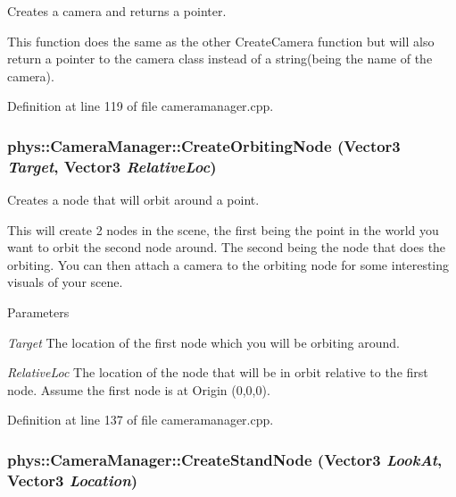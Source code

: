 Creates a camera and returns a pointer. 

This function does the same as the other CreateCamera function but will also return a pointer to the camera class instead of a string(being the name of the camera). 

Definition at line 119 of file cameramanager.cpp.

\hypertarget{classphys_1_1CameraManager_a9a696ea09f174a69bbc6d0bb179b3de4}{
\subsubsection[{CreateOrbitingNode}]{ phys::CameraManager::CreateOrbitingNode ({\bf Vector3} {\em Target}, \/  {\bf Vector3} {\em RelativeLoc})}}
\label{d9/d91/classphys_1_1CameraManager_a9a696ea09f174a69bbc6d0bb179b3de4}


Creates a node that will orbit around a point. 

This will create 2 nodes in the scene, the first being the point in the world you want to orbit the second node around. The second being the node that does the orbiting. You can then attach a camera to the orbiting node for some interesting visuals of your scene. 
\begin{DoxyParams}{Parameters}
\item[{\em Target}]The location of the first node which you will be orbiting around. \item[{\em RelativeLoc}]The location of the node that will be in orbit relative to the first node. Assume the first node is at Origin (0,0,0). \end{DoxyParams}


Definition at line 137 of file cameramanager.cpp.

\hypertarget{classphys_1_1CameraManager_ab5f9ca6b053670e69f5812cf573d5972}{
\subsubsection[{CreateStandNode}]{ phys::CameraManager::CreateStandNode ({\bf Vector3} {\em LookAt}, \/  {\bf Vector3} {\em Location})}}
\label{d9/d91/classphys_1_1CameraManager_ab5f9ca6b053670e69f5812cf573d5972}


